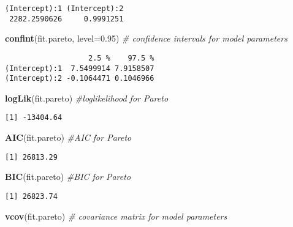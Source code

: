\documentclass[]{book}
\newenvironment{Shaded}{\begin{snugshade}}{\end{snugshade}}
\newcommand{\KeywordTok}[1]{\textcolor[rgb]{0.13,0.29,0.53}{\textbf{#1}}}
\newcommand{\DataTypeTok}[1]{\textcolor[rgb]{0.13,0.29,0.53}{#1}}
\newcommand{\FloatTok}[1]{\textcolor[rgb]{0.00,0.00,0.81}{#1}}
\newcommand{\CommentTok}[1]{\textcolor[rgb]{0.56,0.35,0.01}{\textit{#1}}}
\newcommand{\NormalTok}[1]{#1}
\theoremstyle{definition}
\theoremstyle{definition}
\theoremstyle{definition}
\theoremstyle{remark}
\begin{document}
\begin{verbatim}
(Intercept):1 (Intercept):2 
 2282.2590626     0.9991251 
\end{verbatim}

\begin{Shaded}
\begin{Highlighting}[]
\KeywordTok{confint}\NormalTok{(fit.pareto, }\DataTypeTok{level=}\FloatTok{0.95}\NormalTok{)  }\CommentTok{# confidence intervals for model parameters }
\end{Highlighting}
\end{Shaded}

\begin{verbatim}
                   2.5 %    97.5 %
(Intercept):1  7.5499914 7.9158507
(Intercept):2 -0.1064471 0.1046966
\end{verbatim}

\begin{Shaded}
\begin{Highlighting}[]
\KeywordTok{logLik}\NormalTok{(fit.pareto)               }\CommentTok{#loglikelihood for Pareto}
\end{Highlighting}
\end{Shaded}

\begin{verbatim}
[1] -13404.64
\end{verbatim}

\begin{Shaded}
\begin{Highlighting}[]
\KeywordTok{AIC}\NormalTok{(fit.pareto)                  }\CommentTok{#AIC for Pareto}
\end{Highlighting}
\end{Shaded}

\begin{verbatim}
[1] 26813.29
\end{verbatim}

\begin{Shaded}
\begin{Highlighting}[]
\KeywordTok{BIC}\NormalTok{(fit.pareto)                  }\CommentTok{#BIC for Pareto}
\end{Highlighting}
\end{Shaded}

\begin{verbatim}
[1] 26823.74
\end{verbatim}

\begin{Shaded}
\begin{Highlighting}[]
\KeywordTok{vcov}\NormalTok{(fit.pareto)                 }\CommentTok{# covariance matrix for model parameters }
\end{Highlighting}
\end{Shaded}
\end{document}

